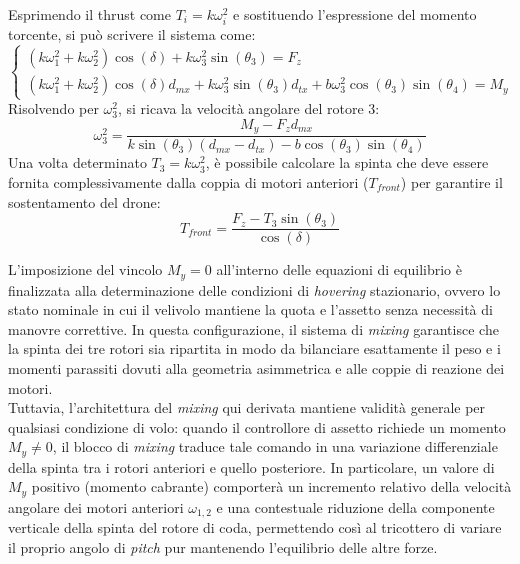 Esprimendo il thrust come $T_i = k \omega_i^2$ e sostituendo l'espressione del momento torcente, si può scrivere il sistema come:
\begin{equation}
    \begin{cases}
    (k \omega_{1}^2 + k \omega_{2}^2) \cos(\delta) + k \omega_{3}^2 \sin(\theta_3) = F_{z} \\
    (k \omega_{1}^2 + k \omega_{2}^2) \cos(\delta) d_{mx} + k \omega_{3}^2 \sin(\theta_3) d_{tx} + b \omega_{3}^2 \cos(\theta_{3}) \sin(\theta_{4}) = M_{y}
    \end{cases}
\end{equation}
Risolvendo per $\omega_{3}^2$, si ricava la velocità angolare del rotore 3:
\begin{equation}
    \omega_3^2 = \frac{M_y - F_{z} d_{mx}}{k \sin(\theta_3) (d_{mx} - d_{tx}) - b \cos(\theta_3)\sin(\theta_4)}
\end{equation}
Una volta determinato $T_3 = k \omega_3^2$, è possibile calcolare la spinta che deve essere fornita complessivamente dalla coppia di motori anteriori ($T_{front}$) per garantire il sostentamento del drone:
\begin{equation}
    T_{front} = \frac{F_{z} - T_3 \sin(\theta_3)}{\cos(\delta)}
\end{equation}

L'imposizione del vincolo $M_y = 0$ all'interno delle equazioni di equilibrio è finalizzata alla determinazione delle condizioni 
di \textit{hovering} stazionario, ovvero lo stato nominale in cui il velivolo mantiene la quota e l'assetto senza necessità di manovre 
correttive. In questa configurazione, il sistema di \textit{mixing} garantisce che la spinta dei tre rotori sia ripartita in modo da 
bilanciare esattamente il peso e i momenti parassiti dovuti alla geometria asimmetrica e alle coppie di reazione dei motori.
\\Tuttavia, l'architettura del \textit{mixing} qui derivata mantiene validità generale per qualsiasi condizione di volo: quando il controllore 
di assetto richiede un momento $M_y \neq 0$, il blocco di \textit{mixing} traduce tale comando in una variazione differenziale della spinta tra i rotori anteriori e quello posteriore. 
In particolare, un valore di $M_y$ positivo (momento cabrante) comporterà un incremento relativo della velocità angolare dei motori 
anteriori $\omega_{1,2}$ e una contestuale riduzione della componente verticale della spinta del rotore di coda, permettendo così al 
tricottero di variare il proprio angolo di \textit{pitch} pur mantenendo l'equilibrio delle altre forze.

